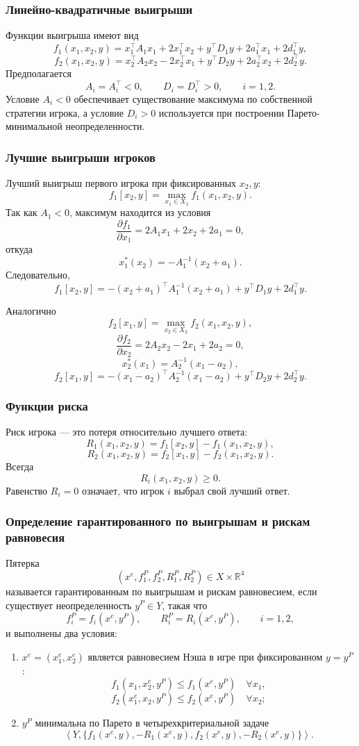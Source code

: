 \documentclass[12pt,a4paper]{article}
\newcommand{\R}{\mathbb{R}}
\begin{document}
\subsubsection{Линейно-квадратичные выигрыши}
Функции выигрыша имеют вид
\[
f_1(x_1,x_2,y)=x_1^\top A_1x_1+2x_1^\top x_2+y^\top D_1y+2a_1^\top x_1+2d_1^\top y,
\]
\[
f_2(x_1,x_2,y)=x_2^\top A_2x_2-2x_2^\top x_1+y^\top D_2y+2a_2^\top x_2+2d_2^\top y.
\]
Предполагается
\[
A_i=A_i^\top<0,
\qquad D_i=D_i^\top>0,
\qquad i=1,2.
\]
Условие $A_i<0$ обеспечивает существование максимума по собственной стратегии игрока, а условие $D_i>0$ используется при построении Парето-минимальной неопределенности.

\subsubsection{Лучшие выигрыши игроков}
Лучший выигрыш первого игрока при фиксированных $x_2,y$:
\[
f_1[x_2,y]=\max_{x_1\in X_1}f_1(x_1,x_2,y).
\]
Так как $A_1<0$, максимум находится из условия
\[
\frac{\partial f_1}{\partial x_1}=2A_1x_1+2x_2+2a_1=0,
\]
откуда
\[
x_1^*(x_2)=-A_1^{-1}(x_2+a_1).
\]
Следовательно,
\[
f_1[x_2,y]=-(x_2+a_1)^\top A_1^{-1}(x_2+a_1)+y^\top D_1y+2d_1^\top y.
\]

Аналогично
\[
f_2[x_1,y]=\max_{x_2\in X_2}f_2(x_1,x_2,y),
\]
\[
\frac{\partial f_2}{\partial x_2}=2A_2x_2-2x_1+2a_2=0,
\]
\[
x_2^*(x_1)=A_2^{-1}(x_1-a_2),
\]
\[
f_2[x_1,y]=-(x_1-a_2)^\top A_2^{-1}(x_1-a_2)+y^\top D_2y+2d_2^\top y.
\]

\subsubsection{Функции риска}
Риск игрока --- это потеря относительно лучшего ответа:
\[
R_1(x_1,x_2,y)=f_1[x_2,y]-f_1(x_1,x_2,y),
\]
\[
R_2(x_1,x_2,y)=f_2[x_1,y]-f_2(x_1,x_2,y).
\]
Всегда
\[
R_i(x_1,x_2,y)\ge 0.
\]
Равенство $R_i=0$ означает, что игрок $i$ выбрал свой лучший ответ.

\subsubsection{Определение гарантированного по выигрышам и рискам равновесия}
Пятерка
\[
(x^e,f_1^P,f_2^P,R_1^P,R_2^P)\in X\times\R^4
\]
называется гарантированным по выигрышам и рискам равновесием, если существует неопределенность $y^P\in Y$, такая что
\[
f_i^P=f_i(x^e,y^P),
\qquad R_i^P=R_i(x^e,y^P),
\qquad i=1,2,
\]
и выполнены два условия:
\begin{enumerate}
  \item $x^e=(x_1^e,x_2^e)$ является равновесием Нэша в игре при фиксированном $y=y^P$:
  \[
  f_1(x_1,x_2^e,y^P)\le f_1(x^e,y^P)\quad \forall x_1,
  \]
  \[
  f_2(x_1^e,x_2,y^P)\le f_2(x^e,y^P)\quad \forall x_2;
  \]
  \item $y^P$ минимальна по Парето в четырехкритериальной задаче
  \[
  \left\langle Y,\{f_1(x^e,y),-R_1(x^e,y),f_2(x^e,y),-R_2(x^e,y)\}\right\rangle.
  \]
\end{enumerate}
\end{document}
